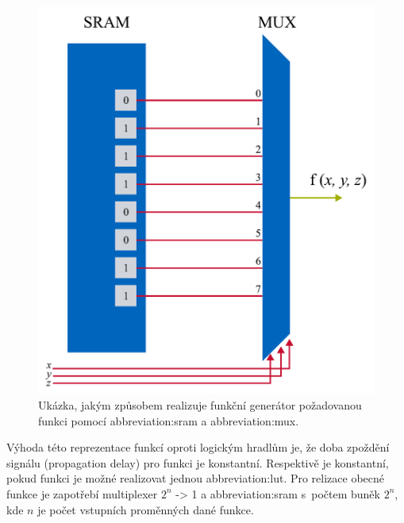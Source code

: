 \documentclass[a4paper, twoside, 11pt]{article}
\begin{document}
	\begin{minipage}[t]{0.45\textwidth}
		\begin{figure}[H]
			\centering
				\includegraphics[width=1\textwidth]{src/pdf/fpga-function-generator.pdf} 
				\caption{Ukázka, jakým způsobem realizuje funkční generátor požadovanou funkci pomocí \gls{abbreviation:sram} a \gls{abbreviation:mux}.}
				\label{fig:fpga-function-generator}
		\end{figure}
	\end{minipage}

	\vspace*{0.5cm}
	Výhoda této reprezentace funkcí oproti logickým hradlům je, že doba zpoždění signálu (propagation delay) pro funkci je konstantní. Respektivě je konstantní, pokud funkci je možné realizovat jednou \gls{abbreviation:lut}. Pro relizace obecné funkce je zapotřebí multiplexer $2^{n}$ -> 1 a \gls{abbreviation:sram} s~počtem buněk $2^{n}$, kde $n$ je počet vstupních proměnných dané funkce. \cite{Sass2010}
\end{document}
